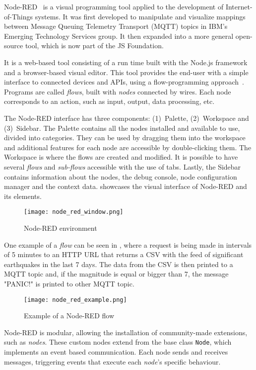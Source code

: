 Node-RED~\cite{node_red} is a visual programming tool applied to the development of Internet-of-Things systems. It was first developed to manipulate and visualize mappings between Message Queuing Telemetry Transport (MQTT) topics in IBM's Emerging Technology Services group. It then expanded into a more general open-source tool, which is now part of the JS Foundation.

It is a web-based tool consisting of a run time built with the Node.js framework and a browser-based visual editor. This tool provides the end-user with a simple interface to connected devices and APIs, using a flow-programming approach~\cite{node_red}. Programs are called \emph{flows}, built with \emph{nodes} connected by wires. Each node corresponds to an action, such as input, output, data processing, etc.

The Node-RED interface has three components: (1)~Palette, (2)~Workspace and (3)~Sidebar. The Palette contains all the nodes installed and available to use, divided into categories. They can be used by dragging them into the workspace and additional features for each node are accessible by double-clicking them. The Workspace is where the flows are created and modified. It is possible to have several \emph{flows} and \emph{sub-flows} accessible with the use of tabs. Lastly, the Sidebar contains information about the nodes, the debug console, node configuration manager and the context data.  showcases the visual interface of Node-RED and its elements.

\begin{figure}[h]
\centering
\texttt{[image: node\_red\_window.png]}
\caption{Node-RED environment}
\label{fig:node_red_window}
\end{figure}

One example of a \emph{flow} can be seen in , where a request is being made in intervals of 5 minutes to an HTTP URL that returns a CSV with the feed of significant earthquakes in the last 7 days. The data from the CSV is then printed to a MQTT topic and, if the magnitude is equal or bigger than 7, the message "PANIC!" is printed to other MQTT topic. 

\begin{figure}[!ht]
\centering
\texttt{[image: node\_red\_example.png]}
\caption{Example of a Node-RED flow}
\label{fig:node_red_example}
\end{figure}

Node-RED is modular, allowing the installation of community-made extensions, such as \textit{nodes}. These custom nodes extend from the base class \texttt{Node}, which implements an event based communication. Each node sends and receives messages, triggering events that execute each \textit{node}'s specific behaviour.

